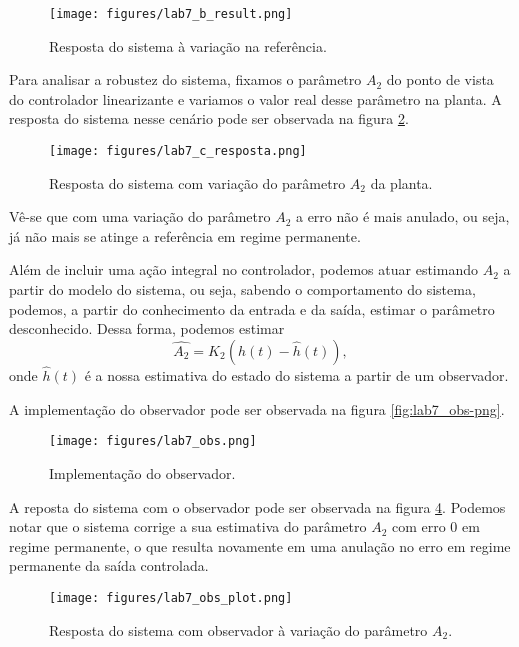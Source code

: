 \documentclass[a4paper]{report}
\begin{document}
\begin{figure}[H]
    \centering
    \texttt{[image: figures/lab7\_b\_result.png]}
    \caption{Resposta do sistema à variação na referência.}
    \label{fig:figures-lab7_b_result-png}
\end{figure}


Para analisar a robustez do sistema, fixamos o parâmetro $A_2$ do ponto de vista do controlador linearizante e variamos o valor real desse parâmetro na planta. A resposta do sistema nesse cenário pode ser observada na figura \ref{fig:figures-lab7_c_resposta-png}.

\begin{figure}[H]
    \centering
    \texttt{[image: figures/lab7\_c\_resposta.png]}
    \caption{Resposta do sistema com variação do parâmetro $A_2$ da planta.}
    \label{fig:figures-lab7_c_resposta-png}
\end{figure}

Vê-se que com uma variação do parâmetro $A_2$ a erro não é mais anulado, ou seja, já não mais se atinge a referência em regime permanente.


Além de incluir uma ação integral no controlador, podemos atuar estimando $A_2$ a partir do modelo do sistema, ou seja, sabendo o comportamento do sistema, podemos, a partir do conhecimento da entrada e da saída, estimar o parâmetro desconhecido. Dessa forma, podemos estimar \[
    \hat{A_2} = K_2 \left( h(t) - \hat{h}(t) \right) 
,\] onde $\hat{h}(t)$ é a nossa estimativa do estado do sistema a partir de um observador.

A implementação do observador pode ser observada na figura \ref{fig:lab7_obs-png}.

\begin{figure}[H]
    \centering
    \texttt{[image: figures/lab7\_obs.png]}
    \caption{Implementação do observador.}
    \label{fig:figures-lab7_obs-png}
\end{figure}

A reposta do sistema com o observador pode ser observada na figura \ref{asdf}. Podemos notar que o sistema corrige a sua estimativa do parâmetro $A_2$ com erro 0 em regime permanente, o que resulta novamente em uma anulação no erro em regime permanente da saída controlada.

\begin{figure}[H]
    \centering
    \texttt{[image: figures/lab7\_obs\_plot.png]}
    \caption{Resposta do sistema com observador à variação do parâmetro $A_2$.}
    \label{asdf}
\end{figure}
\end{document}
